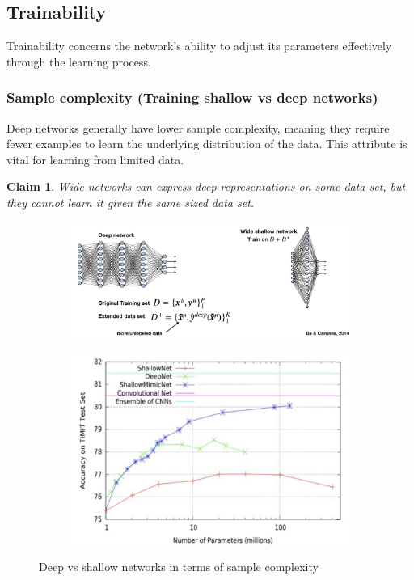 \documentclass[11pt]{book} %
\newtheorem*{claim*}{Claim}
\begin{document}
\subsection{Trainability}
Trainability concerns the network's ability to adjust its parameters effectively through the learning process.

\subsubsection{Sample complexity (Training shallow vs deep networks)}
Deep networks generally have lower sample complexity, meaning they require fewer examples to learn the underlying distribution of the data. 
This attribute is vital for learning from limited data.
\begin{claim*}
    Wide networks can express deep representations on some data set, but they cannot learn it given the same sized data set.
\end{claim*}
\begin{figure}[ht]
    \begin{subfigure}[b]{0.6\textwidth}
        \centering
        \includegraphics[width=\textwidth]{./Figs/deep_trainability2.jpeg}
        \label{fig:sample_complexity1}
    \end{subfigure}
    \hfill
    \begin{subfigure}[b]{0.33\textwidth}
        \centering
        \includegraphics[width=\textwidth]{./Figs/deep_trainability1.jpeg}
        \label{fig:sample_complexity2}
    \end{subfigure}
    \caption{Deep vs shallow networks in terms of sample complexity}
\end{figure}
\end{document}
